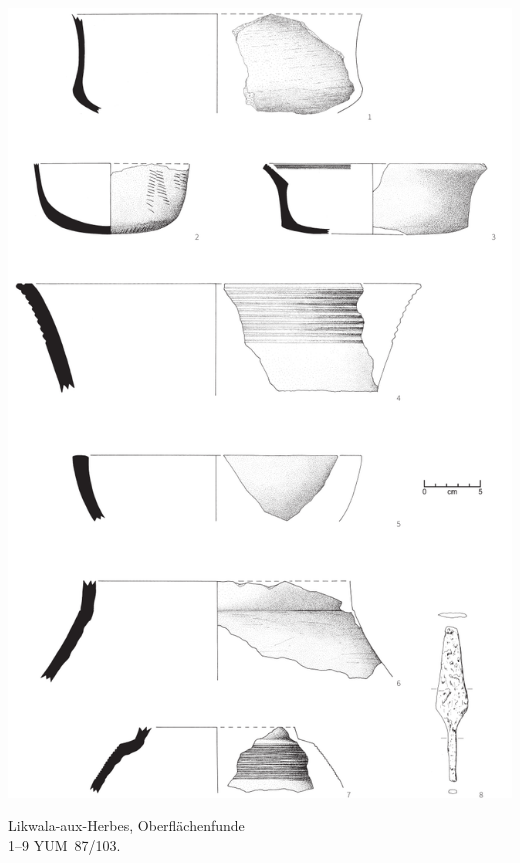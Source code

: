 \begin{pl}[H]
	\includegraphics{plt/Taf75.pdf}
	\vspace{.75em}\caption{Likwala-aux-Herbes, Oberflächenfunde \\ 1--9 YUM~87/103.}
	\label{pl:75}
\end{pl}

